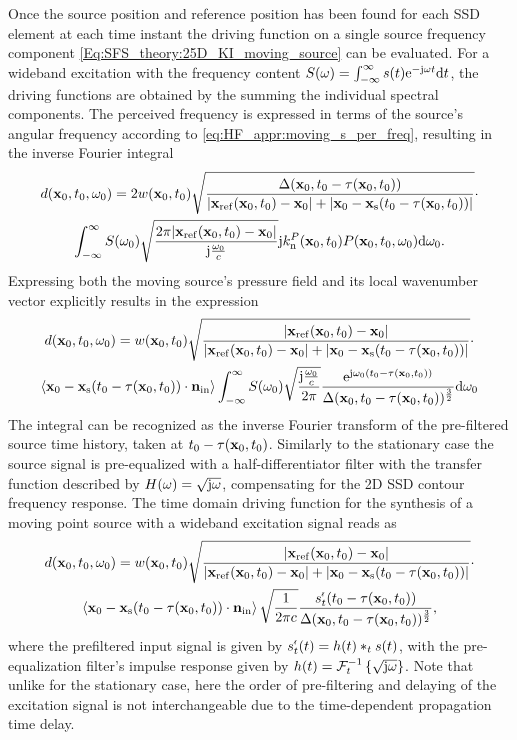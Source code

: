 Once the source position and reference position has been found for each SSD element at each time instant the driving function on a single source frequency component \eqref{Eq:SFS_theory:25D_KI_moving_source} can be evaluated.
For a wideband excitation with the frequency content $S(\omega) = \int_{-\infty}^{\infty} s(t) \mathrm{e}^{-\mathrm{j} \omega t} \mathrm{d} t$, the driving functions are obtained by the summing the individual spectral components.
The perceived frequency is expressed in terms of the source's angular frequency according to \eqref{eq:HF_appr:moving_s_per_freq}, resulting in the inverse Fourier integral
\begin{multline}
\small
d(\vxo,t_0,\omega_0) =2 w(\vxo,t_0) 
\sqrt{\frac{\Delta(\vxo,t_0-\tau(\vxo,t_0))}{|\vxref(\vxo,t_0)-\vxo|+|\vxo - \vxs(t_0-\tau(\vxo,t_0))|}}
\cdot \\ %
 \int_{-\infty}^{\infty} S(\omega_0)
\sqrt{\frac{2\pi |\vxref(\vxo,t_0)-\vxo|}{\ti \frac{\omega_0}{c} }}
\ti k_{\mathrm{n}}^P(\vxo,t_0) P(\vxo,t_0,\omega_0) \td \omega_0.
\end{multline}
Expressing both the moving source's pressure field and its local wavenumber vector explicitly results in the expression
\begin{multline}
\small
d(\vxo,t_0,\omega_0) = w(\vxo,t_0) 
\sqrt{\frac{|\vxref(\vxo,t_0)-\vxo| }{|\vxref(\vxo,t_0)-\vxo|+|\vxo - \vxs(t_0-\tau(\vxo,t_0))|}}
\cdot \\ %
\left< \vxo -\vxs(t_0-\tau(\vxo,t_0)) \cdot \vni \right>
\int_{-\infty}^{\infty} S(\omega_0)
\sqrt{\frac{\ti \frac{\omega_0}{c}}{2\pi}}
\frac{\te^{\ti \omega_0\left( t_0 - \tau( \vxo,t_0 )\right)}}{\Delta(\vxo,t_0-\tau( \vxo, t_0 ))^{\frac{3}{2}}}
 \td \omega_0
\end{multline}
The integral can be recognized as the inverse Fourier transform of the pre-filtered source time history, taken at $t_0 - \tau( \mathbf{x}_0,t_0 )$.
Similarly to the stationary case the source signal is pre-equalized with a half-differentiator filter with the transfer function described by $H(\omega) = \sqrt{\mathrm{j} \omega}$, compensating for the 2D SSD contour frequency response.
The time domain driving function for the synthesis of a moving point source with a wideband excitation signal reads as
\begin{multline}
\small
d(\vxo,t_0,\omega_0) = w(\vxo,t_0) 
\sqrt{\frac{|\vxref(\vxo,t_0)-\vxo| }{|\vxref(\vxo,t_0)-\vxo|+|\vxo - \vxs(t_0-\tau(\vxo,t_0))|}}
\cdot \\ %
\left< \vxo -\vxs(t_0-\tau(\vxo,t_0)) \cdot \vni \right>
\sqrt{\frac{1}{2\pi c}}
\frac{ s^{\nshortmid}_t(t_0 - \tau( \vxo,t_0 )) }{\Delta(\vxo,t_0-\tau( \vxo, t_0 ))^{\frac{3}{2}}},
\label{Eq:Moving_source:25D_WFS}
\end{multline}
where the prefiltered input signal is given by $ s^{\nshortmid}_t(t) = h(t) \ast_{t} s(t)$, with the pre-equalization filter's impulse response given by $h(t) = \mathcal{F}^{-1}_t\left\{ \sqrt{\mathrm{j} \omega} \right\}$.
Note that unlike for the stationary case, here the order of pre-filtering and delaying of the excitation signal is not interchangeable due to the time-dependent propagation time delay.

